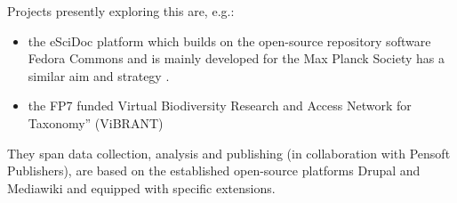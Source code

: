 \documentclass{llncs}
\begin{document}
Projects presently exploring this are, e.g.:

\begin{itemize}
  \item the eSciDoc platform which builds on the open-source
    repository software Fedora Commons \cite{Feudora} and is mainly
    developed for the Max Planck Society has a similar aim and
    strategy \cite{Dreyer}.
  \item the FP7 funded Virtual Biodiversity Research and Access
    Network for Taxonomy'' (ViBRANT) \cite{vbrant,Roberts,Blagoderov}
\end{itemize}

They span data collection, analysis and publishing (in collaboration
with Pensoft Publishers), are based on the established open-source
platforms Drupal \cite{Drupal} and Mediawiki \cite{MediaWiki} and
equipped with specific extensions.

\end{document}
